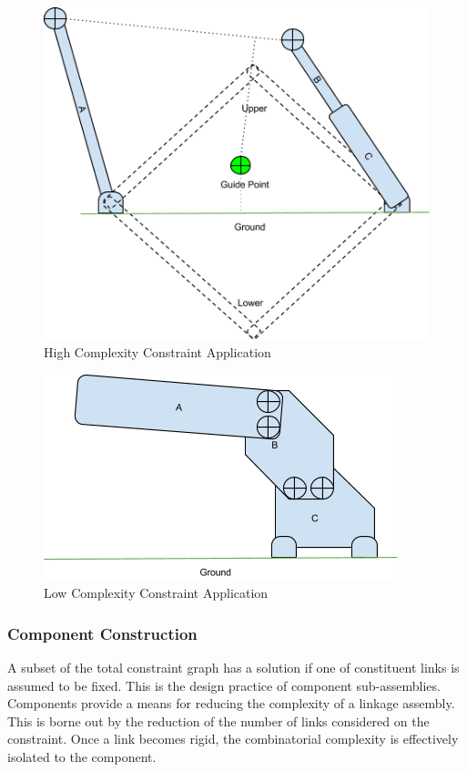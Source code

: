 \documentclass[]{report}
\begin{document}
\begin{figure}[h!]
	\centering
	\includegraphics[scale=0.7]{images/image03.png}
	\caption{High Complexity Constraint Application}
	\label{fig:high-complexity}
\end{figure} 

\begin{figure}[h!]
	\centering
	\includegraphics[scale=0.7]{images/image16.png}
	\caption{Low Complexity Constraint Application}
	\label{fig:low-complexity}
\end{figure} 

\subsubsection{Component Construction}

A subset of the total constraint graph has a solution if one of constituent links is assumed to be fixed. 
This is the design practice of component sub-assemblies.
Components provide a means for reducing the complexity of a linkage assembly. This is borne out by the reduction of the number of links considered on the constraint. Once a link becomes rigid, the combinatorial complexity is effectively isolated to the component.
\end{document}
